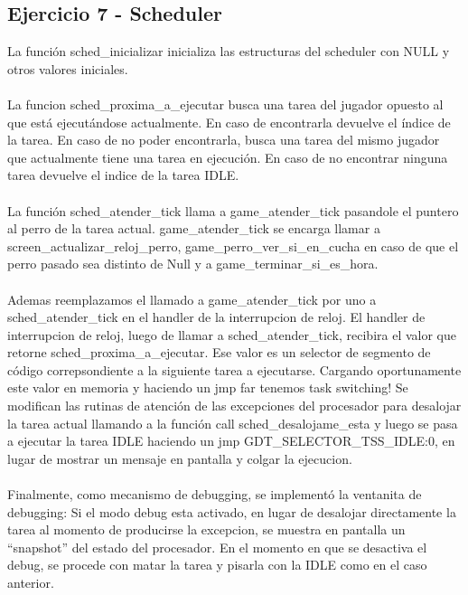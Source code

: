 \documentclass[10pt,a4paper,spanish]{article}
\begin{document}
\subsection{Ejercicio 7 - Scheduler}
La función  sched\_inicializar inicializa las estructuras del scheduler con NULL y otros valores iniciales.
\\ \\
La funcion sched\_proxima\_a\_ejecutar busca una tarea del jugador opuesto al que está ejecutándose actualmente. En caso de encontrarla devuelve el índice de la tarea. En caso de no poder encontrarla, busca una tarea del mismo jugador que actualmente tiene una tarea en ejecución. En caso de no encontrar ninguna tarea devuelve el indice de la tarea IDLE.
\\ \\
La función sched\_atender\_tick llama a game\_atender\_tick pasandole el puntero al perro de la tarea actual. game\_atender\_tick se encarga llamar a screen\_actualizar\_reloj\_perro, game\_perro\_ver\_si\_en\_cucha en caso de que el perro pasado sea distinto de Null y a game\_terminar\_si\_es\_hora.
\\ \\
Ademas reemplazamos el llamado a game\_atender\_tick por uno a sched\_atender\_tick en el handler de la interrupcion de reloj.
El handler de interrupcion de reloj, luego de llamar a sched\_atender\_tick, recibira el valor que retorne sched\_proxima\_a\_ejecutar. Ese valor es un selector de segmento de código correpsondiente a la siguiente tarea a ejecutarse. Cargando oportunamente este valor en memoria y haciendo un jmp far tenemos task switching!
Se modifican las rutinas de atención de las excepciones del procesador para desalojar la tarea actual llamando a la función call sched\_desalojame\_esta y luego se pasa a ejecutar la tarea IDLE haciendo un jmp GDT\_SELECTOR\_TSS\_IDLE:0, en lugar de mostrar un mensaje en pantalla y colgar la ejecucion.
\\ \\
Finalmente, como mecanismo de debugging, se implementó la ventanita de debugging: Si el modo debug esta activado, en lugar de desalojar directamente la tarea al momento de producirse la excepcion, se muestra en pantalla un “snapshot” del estado del procesador. En el momento en que se desactiva el debug, se procede con matar la tarea y pisarla con la IDLE como en el caso anterior.






\end{document}
